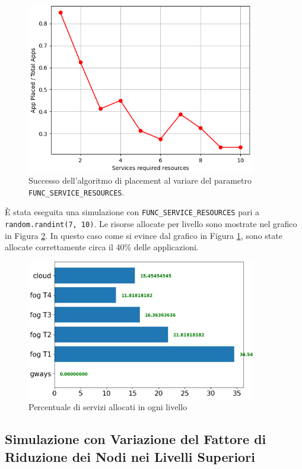 \begin{figure}[!ht]
  \includegraphics[width=10cm]{images/resources_placement_success}
  \centering
  \caption{Successo dell'algoritmo di placement al variare del parametro \texttt{FUNC\_SERVICE\_RESOURCES}.}
  \label{fig:resources_placement_success}
\end{figure}

È stata eseguita una simulazione con \texttt{FUNC\_SERVICE\_RESOURCES} pari a \texttt{random.randint(7, 10)}. Le risorse allocate per livello sono mostrate nel grafico in Figura \ref{fig:resources_placement_per_level}. In questo caso come si evince dal grafico in Figura \ref{fig:resources_placement_success}, sono state allocate correttamente circa il 40\% delle applicazioni.

\begin{figure}[!ht]
  \includegraphics[width=10cm]{images/resources_placement_per_level}
  \centering
  \caption{Percentuale di servizi allocati in ogni livello}
  \label{fig:resources_placement_per_level}
\end{figure}

\subsection{Simulazione con Variazione del Fattore di Riduzione dei Nodi nei Livelli Superiori}

